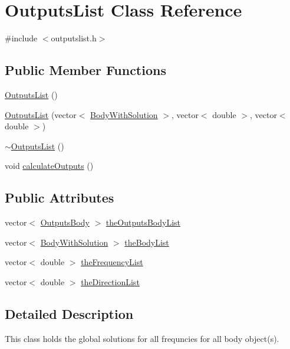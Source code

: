 \hypertarget{class_outputs_list}{\section{Outputs\-List Class Reference}
\label{class_outputs_list}
}


{\ttfamily \#include $<$outputslist.\-h$>$}

\subsection*{Public Member Functions}
\begin{DoxyCompactItemize}
\item 
\hyperlink{class_outputs_list_a5f3ea650f5c9ae5e29ad34f2d051e915}{Outputs\-List} ()
\item 
\hyperlink{class_outputs_list_a3a7ab0f85a9874b5563ad3a650219429}{Outputs\-List} (vector$<$ \hyperlink{class_body_with_solution}{Body\-With\-Solution} $>$, vector$<$ double $>$, vector$<$ double $>$)
\item 
\hyperlink{class_outputs_list_ae3e4bc9bece0fd81594fd42576831c0b}{$\sim$\-Outputs\-List} ()
\item 
void \hyperlink{class_outputs_list_a31dd7270ed3468e78168bb1bf85fd79d}{calculate\-Outputs} ()
\end{DoxyCompactItemize}
\subsection*{Public Attributes}
\begin{DoxyCompactItemize}
\item 
vector$<$ \hyperlink{class_outputs_body}{Outputs\-Body} $>$ \hyperlink{class_outputs_list_a060736f6168b7a7ff22480c59ab1cae1}{the\-Outputs\-Body\-List}
\item 
vector$<$ \hyperlink{class_body_with_solution}{Body\-With\-Solution} $>$ \hyperlink{class_outputs_list_a641a2087534a39ba07e5dcc373c3e993}{the\-Body\-List}
\item 
vector$<$ double $>$ \hyperlink{class_outputs_list_afb577c627b76bd4734a450af611313e7}{the\-Frequency\-List}
\item 
vector$<$ double $>$ \hyperlink{class_outputs_list_a2378aea897a70d83842b4aabe3d3c3c2}{the\-Direction\-List}
\end{DoxyCompactItemize}


\subsection{Detailed Description}
This class holds the global solutions for all frequncies for all body object(s). 

